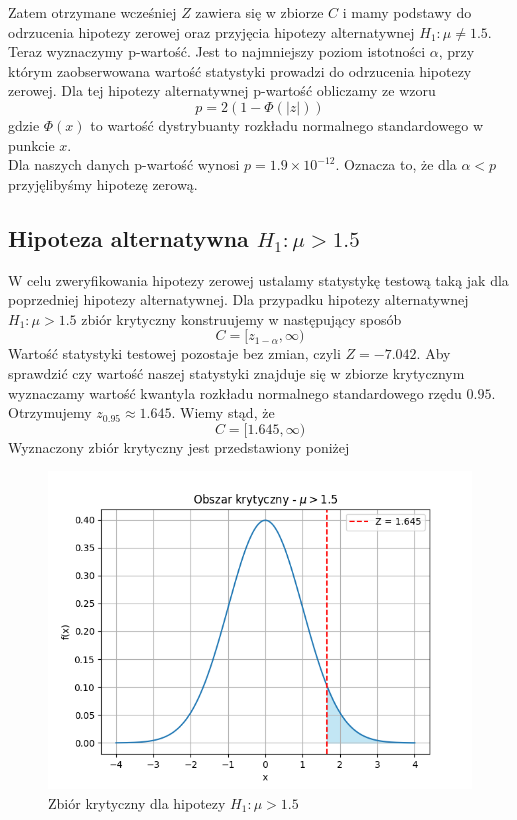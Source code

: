 \documentclass{article}
\begin{document}
Zatem otrzymane wcześniej $Z$ zawiera się w zbiorze $C$ i mamy podstawy do odrzucenia hipotezy zerowej oraz przyjęcia hipotezy alternatywnej $H_{1}:\mu\neq1.5$.\\
Teraz wyznaczymy p-wartość. Jest to najmniejszy poziom istotności $\alpha$, przy którym zaobserwowana wartość statystyki prowadzi do odrzucenia hipotezy zerowej. Dla tej hipotezy alternatywnej p-wartość obliczamy ze wzoru
\begin{equation}
    p = 2(1-\Phi(|z|))
\end{equation}
gdzie $\Phi(x)$ to wartość dystrybuanty rozkładu normalnego standardowego w punkcie $x$.\\
Dla naszych danych p-wartość wynosi $p=1.9\times10^{-12}$. Oznacza to, że dla $\alpha<p$ przyjęlibyśmy hipotezę zerową.

\subsection{Hipoteza alternatywna $H_{1}: \mu>1.5$}
W celu zweryfikowania hipotezy zerowej ustalamy statystykę testową taką jak dla poprzedniej hipotezy alternatywnej. Dla przypadku hipotezy alternatywnej $H_{1}:\mu>1.5$ zbiór krytyczny konstruujemy w następujący sposób
\begin{equation}
C = [z_{1-\alpha}, \infty)
\end{equation}
Wartość statystyki testowej pozostaje bez zmian, czyli $Z=-7.042$. Aby sprawdzić czy wartość naszej statystyki znajduje się w zbiorze krytycznym wyznaczamy wartość kwantyla rozkładu normalnego standardowego rzędu $0.95$. Otrzymujemy $z_{0.95}\approx1.645$. Wiemy stąd, że 
\begin{equation}
C = [1.645,\infty)
\end{equation}
Wyznaczony zbiór krytyczny jest przedstawiony poniżej
\begin{figure}[H]
    \centering
    \includegraphics[scale=0.5]{mu_g.png}
    \caption{Zbiór krytyczny dla hipotezy $H_{1}:\mu>1.5$}
    \label{fig:2}
\end{figure}
\end{document}
